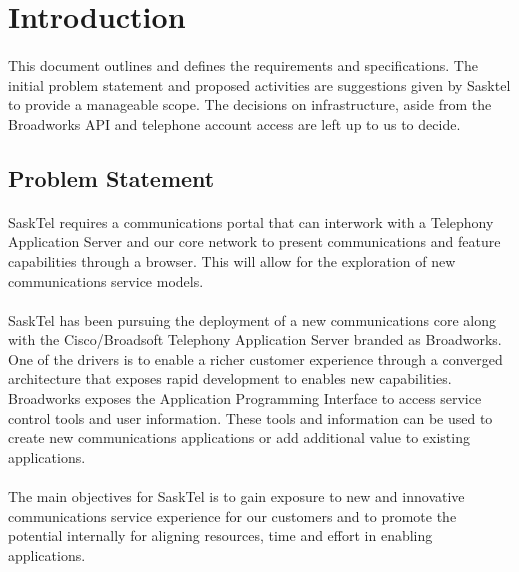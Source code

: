\documentclass[12pt]{article}
\begin{document}
\section{Introduction}
\paragraph{}
	This document outlines and defines the requirements and specifications. The initial problem statement and proposed activities are suggestions given by Sasktel to provide a manageable scope.
The decisions on infrastructure, aside from the Broadworks API and telephone account access are left up to us to decide. 
\subsection{Problem Statement}
\paragraph{} 
	SaskTel requires a communications portal that can interwork with a Telephony Application Server and our core network to present communications and feature capabilities through a browser.  This will allow for the exploration of new communications service models. 
\paragraph{} 
	SaskTel has been pursuing the deployment of a new communications core along with the Cisco/Broadsoft Telephony Application Server branded as Broadworks.  One of the drivers is to enable a richer customer experience through a converged architecture that exposes rapid development to enables new capabilities.  Broadworks exposes the Application Programming Interface to access service control tools and user information.  These tools and information can be used to create new communications applications or add additional value to existing applications.  
\paragraph{} 
	The main objectives for SaskTel is to gain exposure to new and innovative communications service experience for our customers and to promote the potential internally for aligning resources, time and effort in enabling applications.
\end{document}
